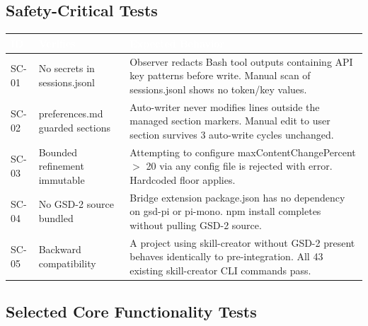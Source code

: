 \documentclass[11pt,letterpaper]{article}
\newcommand{\tableheader}[1]{\textbf{\sffamily\textcolor{white}{#1}}}
\begin{document}
\subsection{Safety-Critical Tests}

\begin{center}
\begin{tabularx}{\textwidth}{L{1.5cm}L{4.5cm}X}
\toprule
{}
\tableheader{ID} & \tableheader{Verifies} & \tableheader{Expected Behavior} \\
\midrule
SC-01 & No secrets in sessions.jsonl & Observer redacts Bash tool outputs containing API key patterns before write. Manual scan of sessions.jsonl shows no token/key values. \\
SC-02 & preferences.md guarded sections & Auto-writer never modifies lines outside the managed section markers. Manual edit to user section survives 3 auto-write cycles unchanged. \\
SC-03 & Bounded refinement immutable & Attempting to configure maxContentChangePercent $>$ 20 via any config file is rejected with error. Hardcoded floor applies. \\
SC-04 & No GSD-2 source bundled & Bridge extension package.json has no dependency on gsd-pi or pi-mono. npm install completes without pulling GSD-2 source. \\
SC-05 & Backward compatibility & A project using skill-creator without GSD-2 present behaves identically to pre-integration. All 43 existing skill-creator CLI commands pass. \\
\bottomrule
\end{tabularx}
\end{center}

\subsection{Selected Core Functionality Tests}
\end{document}
